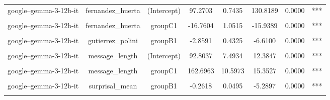 \begin{table}[!h]
{\begin{tabular}{lccccccc}
google--gemma-3-12b-it & fernandez_huerta & (Intercept) & 97.2703 & 0.7435 & 130.8189 & 0.0000 & ***\\
\cellcolor{gray!10}{google--gemma-3-12b-it} & \cellcolor{gray!10}{fernandez_huerta} & \cellcolor{gray!10}{groupB1} & \cellcolor{gray!10}{-4.3123} & \cellcolor{gray!10}{1.0515} & \cellcolor{gray!10}{-4.1010} & \cellcolor{gray!10}{0.0072} & \cellcolor{gray!10}{**}\\
google--gemma-3-12b-it & fernandez_huerta & groupC1 & -16.7604 & 1.0515 & -15.9389 & 0.0000 & ***\\
\cellcolor{gray!10}{google--gemma-3-12b-it} & \cellcolor{gray!10}{gutierrez_polini} & \cellcolor{gray!10}{(Intercept)} & \cellcolor{gray!10}{45.7901} & \cellcolor{gray!10}{0.3059} & \cellcolor{gray!10}{149.7104} & \cellcolor{gray!10}{0.0000} & \cellcolor{gray!10}{***}\\
\addlinespace
google--gemma-3-12b-it & gutierrez_polini & groupB1 & -2.8591 & 0.4325 & -6.6100 & 0.0000 & ***\\
\cellcolor{gray!10}{google--gemma-3-12b-it} & \cellcolor{gray!10}{gutierrez_polini} & \cellcolor{gray!10}{groupC1} & \cellcolor{gray!10}{-8.1961} & \cellcolor{gray!10}{0.4325} & \cellcolor{gray!10}{-18.9483} & \cellcolor{gray!10}{0.0000} & \cellcolor{gray!10}{***}\\
google--gemma-3-12b-it & message_length & (Intercept) & 92.8037 & 7.4934 & 12.3847 & 0.0000 & ***\\
\cellcolor{gray!10}{google--gemma-3-12b-it} & \cellcolor{gray!10}{message_length} & \cellcolor{gray!10}{groupB1} & \cellcolor{gray!10}{82.4185} & \cellcolor{gray!10}{10.5973} & \cellcolor{gray!10}{7.7773} & \cellcolor{gray!10}{0.0000} & \cellcolor{gray!10}{***}\\
google--gemma-3-12b-it & message_length & groupC1 & 162.6963 & 10.5973 & 15.3527 & 0.0000 & ***\\
\addlinespace
\cellcolor{gray!10}{google--gemma-3-12b-it} & \cellcolor{gray!10}{surprisal_mean} & \cellcolor{gray!10}{(Intercept)} & \cellcolor{gray!10}{1.8314} & \cellcolor{gray!10}{0.0350} & \cellcolor{gray!10}{52.3230} & \cellcolor{gray!10}{0.0000} & \cellcolor{gray!10}{***}\\
google--gemma-3-12b-it & surprisal_mean & groupB1 & -0.2618 & 0.0495 & -5.2897 & 0.0000 & ***\\
\cellcolor{gray!10}{google--gemma-3-12b-it} & \cellcolor{gray!10}{surprisal_mean} & \cellcolor{gray!10}{groupC1} & \cellcolor{gray!10}{-0.5552} & \cellcolor{gray!10}{0.0495} & \cellcolor{gray!10}{-11.2155} & \cellcolor{gray!10}{0.0000} & \cellcolor{gray!10}{***}\\

\end{tabular}}
\end{table}
